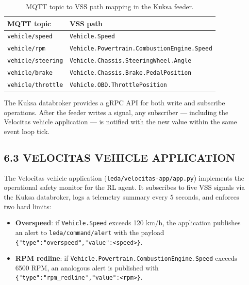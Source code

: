 \documentclass[12pt,a4paper]{article}
\begin{document}
\begin{table}[H]
  \centering
  \caption{MQTT topic to VSS path mapping in the Kuksa feeder.}
  \label{tab:vss-map}
  \vspace{0.5\baselineskip}
  \begin{tabular}{ll}
    \toprule
    \textbf{MQTT topic} & \textbf{VSS path} \\
    \midrule
    \texttt{vehicle/speed}    & \texttt{Vehicle.Speed} \\
    \texttt{vehicle/rpm}      & \texttt{Vehicle.Powertrain.CombustionEngine.Speed} \\
    \texttt{vehicle/steering} & \texttt{Vehicle.Chassis.SteeringWheel.Angle} \\
    \texttt{vehicle/brake}    & \texttt{Vehicle.Chassis.Brake.PedalPosition} \\
    \texttt{vehicle/throttle} & \texttt{Vehicle.OBD.ThrottlePosition} \\
    \bottomrule
  \end{tabular}
\end{table}

The Kuksa databroker provides a gRPC API for both write and subscribe
operations. After the feeder writes a signal, any subscriber --- including the
Velocitas vehicle application --- is notified with the new value within the
same event loop tick.

\subsection*{6.3 \quad VELOCITAS VEHICLE APPLICATION}

\indent The Velocitas vehicle application (\texttt{leda/velocitas-app/app.py})
implements the operational safety monitor for the RL agent. It subscribes to
five VSS signals via the Kuksa databroker, logs a telemetry summary every
5 seconds, and enforces two hard limits:

\begin{itemize}
  \item \textbf{Overspeed}: if \texttt{Vehicle.Speed} exceeds 120 km/h, the
    application publishes an alert to \texttt{leda/command/alert} with the
    payload \texttt{\{"type":"overspeed","value":<speed>\}}.
  \item \textbf{RPM redline}: if
    \texttt{Vehicle.Powertrain.CombustionEngine.Speed} exceeds 6500 RPM, an
    analogous alert is published with \texttt{\{"type":"rpm\_redline","value":<rpm>\}}.
\end{itemize}
\end{document}
